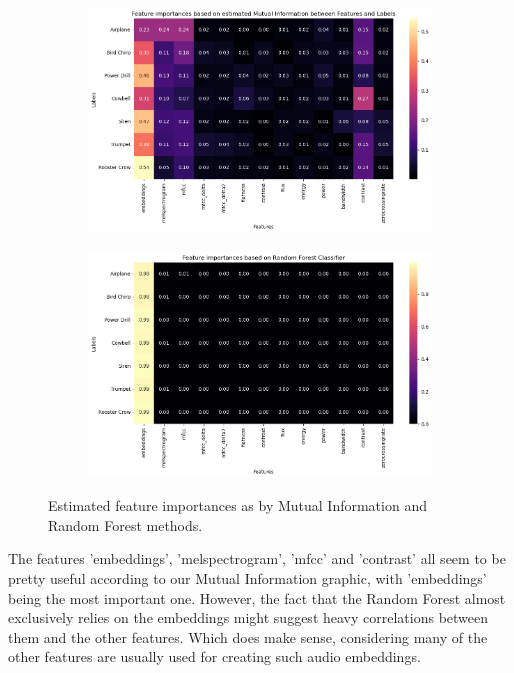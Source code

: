 \begin{figure}[htbp]
  \centering
  \begin{subfigure}[b]{0.49\textwidth}
    \includegraphics[width=\textwidth]{figs/1_MI.png}
  \end{subfigure}
  \hfill
  \begin{subfigure}[b]{0.49\textwidth}
    \includegraphics[width=\textwidth]{figs/1_RF.png}
  \end{subfigure}
  \caption{Estimated feature importances as by Mutual Information and Random Forest methods.}
  \label{fig:1_FI}
\end{figure}

The features 'embeddings', 'melspectrogram', 'mfcc' and 'contrast' all seem to be pretty useful according to our Mutual Information graphic, with 'embeddings' being the most important one. However, the fact that the Random Forest almost exclusively relies on the embeddings might suggest heavy correlations between them and the other features. Which does make sense, considering many of the other features are usually used for creating such audio embeddings.


